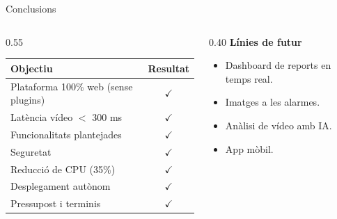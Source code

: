 
\begin{frame}{Conclusions}
  \vspace{0.2em}
  \begin{columns}[T]
    \begin{column}{0.55\textwidth}
      \renewcommand{\arraystretch}{1.3}
      \begin{tabular}{lc}
        \toprule
        \textbf{Objectiu} & \textbf{Resultat} \\
        \midrule
        Plataforma 100\% web (sense plugins) & \textcolor{accentgreen!70!black}{\textbf{$\checkmark$}} \\
        Latència vídeo $<$ 300 ms & \textcolor{accentgreen!70!black}{\textbf{$\checkmark$}} \\
        Funcionalitats plantejades & \textcolor{accentgreen!70!black}{\textbf{$\checkmark$}} \\
        Seguretat & \textcolor{accentgreen!70!black}{\textbf{$\checkmark$}} \\
        Reducció de CPU (35\%) & \textcolor{accentgreen!70!black}{\textbf{$\checkmark$}} \\
        Desplegament autònom & \textcolor{accentgreen!70!black}{\textbf{$\checkmark$}} \\
        Pressupost i terminis & \textcolor{accentgreen!70!black}{\textbf{$\checkmark$}} \\
        \bottomrule
      \end{tabular}
    \end{column}

    \begin{column}{0.40\textwidth}
      \textbf{Línies de futur}
      \begin{itemize}
        \item Dashboard de reports en temps real.
        \item Imatges a les alarmes.
        \item Anàlisi de vídeo amb IA.
        \item App mòbil.
      \end{itemize}
    \end{column}
  \end{columns}
\end{frame}

